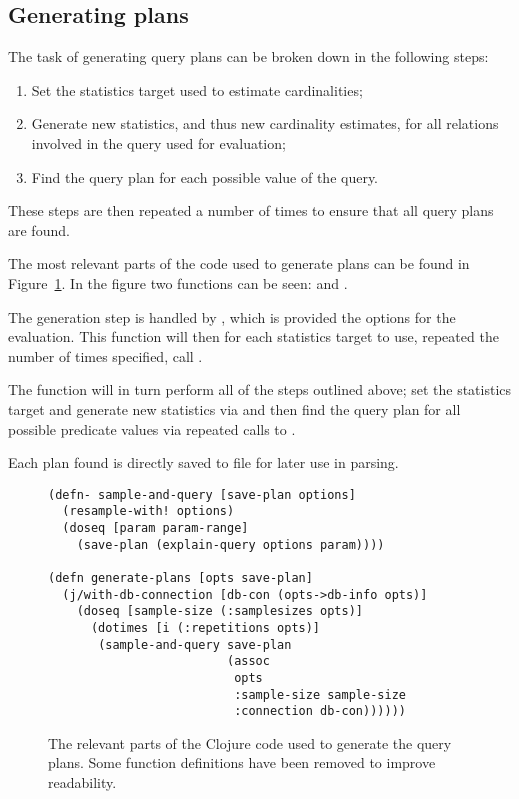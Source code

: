 \subsection{Generating plans}\label{sec:generatingplans}
The task of generating query plans can be broken down in the following steps:
\begin{enumerate}
\item Set the statistics target used to estimate cardinalities;
\item Generate new statistics, and thus new cardinality estimates, for all
  relations involved in the query used for evaluation;
\item Find the query plan for each possible value of the query.
\end{enumerate}
These steps are then repeated a number of times to ensure that all query plans
are found.

The most relevant parts of the code used to generate plans can be found in
Figure~\ref{fig:clj:generating}. In the figure two functions can be seen:
 and .

The generation step is handled by , which is provided the
options for the evaluation. This function will then for each statistics target to use,
repeated the number of times specified, call .

The  function will in turn perform all of the steps
outlined above; set the statistics target and generate new statistics via
 and then find the query plan for all possible predicate
values via repeated calls to .

Each plan found is directly saved to file for later use in parsing.

\begin{figure}[ht]
  \begin{verbatim}
(defn- sample-and-query [save-plan options]
  (resample-with! options)
  (doseq [param param-range]
    (save-plan (explain-query options param))))

(defn generate-plans [opts save-plan]
  (j/with-db-connection [db-con (opts->db-info opts)]
    (doseq [sample-size (:samplesizes opts)]
      (dotimes [i (:repetitions opts)]
       (sample-and-query save-plan
                         (assoc
                          opts
                          :sample-size sample-size
                          :connection db-con))))))
   \end{verbatim}
   \caption[The Clojure code to generate all query plans]{The relevant parts of the
     Clojure code used to generate the query plans. Some function definitions
     have been removed to improve readability.}
\label{fig:clj:generating}
\end{figure}

